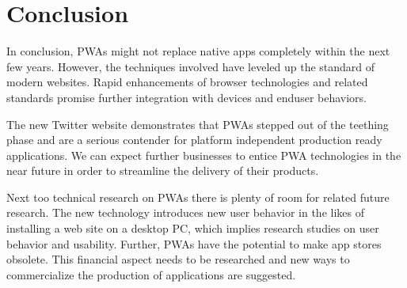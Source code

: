 \chapter{Conclusion}

In conclusion, PWAs might not replace native apps completely within the next few years. However, the techniques involved have leveled up the standard of modern websites. Rapid enhancements of browser technologies and related standards promise further integration with devices and enduser behaviors.

The new Twitter website demonstrates that PWAs stepped out of the teething phase and are a serious contender for platform independent production ready applications. We can expect further businesses to entice PWA technologies in the near future in order to streamline the delivery of their products.

Next too technical research on PWAs there is plenty of room for related future research. The new technology introduces new user behavior in the likes of installing a web site on a desktop PC, which implies research studies on user behavior and usability. Further, PWAs have the potential to make app stores obsolete. This financial aspect needs to be researched and new ways to commercialize the production of applications are suggested.
